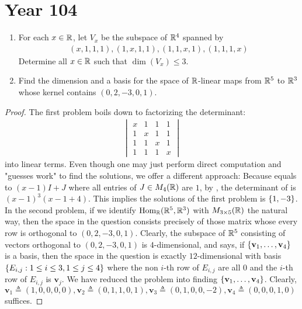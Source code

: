 \documentclass{report}
\begin{document}
\section{Year 104}
\begin{question}{}{}
\begin{enumerate}[label=(\roman*)]
  \item For each $x\in\mathbb{R}$, let $V_x$ be the subspace of  $\mathbb{R}^4$ spanned by 
   \begin{align*}
      (x,1,1,1),(1,x,1,1),(1,1,x,1),(1,1,1,x)
  \end{align*}
  Determine all $x\in\mathbb{R}$ such that $\operatorname{dim}(V_x)\leq 3$. 
  \item Find the dimension and a basis for the space of $\mathbb{R}$-linear maps from $\mathbb{R}^5$ to $\mathbb{R}^3$ whose kernel contains  $(0,2,-3,0,1)$. 
\end{enumerate}
\end{question}
\begin{proof}
The first problem boils down to factorizing the determinant:
\begin{align}
\label{xma}
\begin{vmatrix}
  x& 1 & 1 & 1 \\
  1 & x & 1 & 1\\
  1 & 1 & x & 1 \\
  1 & 1 & 1 & x
\end{vmatrix}
\end{align}
into linear terms. Even though one may just perform direct computation and "guesses work" to find the solutions, we offer a different approach: Because  equals to $(x-1)I+ J$ where all entries of $J \in M_4(\mathbb{R})$ are $1$, by , the determinant of  is  $(x-1)^3(x-1+4)$. This implies the solutions of the first problem is $\left\{ 1,-3 \right\}$. \\

In the second problem, if we identify $\operatorname{Hom}_{\mathbb{R}}(\mathbb{R}^5,\mathbb{R}^3)$ with $M_{3\times 5}(\mathbb{R})$ the natural way, then the space in the question consists precisely of those matrix whose every row is orthogonal to $(0,2,-3,0,1)$. Clearly, the subspace of $\mathbb{R}^5$ consisting of vectors orthogonal to $(0,2,-3,0,1)$ is $4$-dimensional, and says, if $\left\{ \textbf{v}_1,\dots ,\textbf{v}_4 \right\}$ is a basis, then the space in the question is exactly $12$-dimensional with basis  $\left\{ E_{i,j}:1\leq i\leq 3,1\leq j\leq 4 \right\}$ where the non $i$-th row of $E_{i,j}$ are all $0$ and the  $i$-th row of  $E_{i,j}$ is $\textbf{v}_j$. We have reduced the problem into finding $\left\{ \textbf{v}_1,\dots ,\textbf{v}_4 \right\}$. Clearly, $\textbf{v}_1\triangleq (1,0,0,0,0),\textbf{v}_2\triangleq (0,1,1,0,1),\textbf{v}_3\triangleq (0,1,0,0,-2),\textbf{v}_4\triangleq (0,0,0,1,0)$ suffices.
\end{proof}
\end{document}
